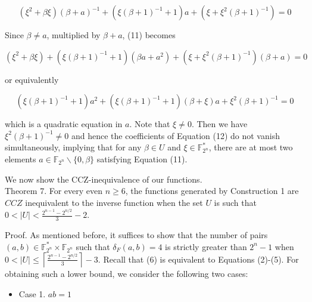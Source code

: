 \documentclass[10pt]{article}
\begin{document}
\begin{equation*}
\left(\xi^{2}+\beta \xi\right)(\beta+a)^{-1}+\left(\xi(\beta+1)^{-1}+1\right) a+\left(\xi+\xi^{2}(\beta+1)^{-1}\right)=0 \tag{11}
\end{equation*}


Since $\beta \neq a$, multiplied by $\beta+a$, (11) becomes

$$
\left(\xi^{2}+\beta \xi\right)+\left(\xi(\beta+1)^{-1}+1\right)\left(\beta a+a^{2}\right)+\left(\xi+\xi^{2}(\beta+1)^{-1}\right)(\beta+a)=0
$$

or equivalently


\begin{equation*}
\left(\xi(\beta+1)^{-1}+1\right) a^{2}+\left(\xi(\beta+1)^{-1}+1\right)(\beta+\xi) a+\xi^{2}(\beta+1)^{-1}=0 \tag{12}
\end{equation*}


which is a quadratic equation in $a$. Note that $\xi \neq 0$. Then we have $\xi^{2}(\beta+1)^{-1} \neq 0$ and hence the coefficients of Equation (12) do not vanish simultaneously, implying that for any $\beta \in U$ and $\xi \in \mathbb{F}_{2^{n}}^{*}$, there are at most two elements $a \in \mathbb{F}_{2^{n}} \backslash\{0, \beta\}$ satisfying Equation (11).

We now show the CCZ-inequivalence of our functions.\\
Theorem 7. For every even $n \geq 6$, the functions generated by Construction 1 are $C C Z$ inequivalent to the inverse function when the set $U$ is such that $0<|U|<\frac{2^{n-1}-2^{n / 2}}{3}-2$.

Proof. As mentioned before, it suffices to show that the number of pairs $(a, b) \in \mathbb{F}_{2^{n}}^{*} \times \mathbb{F}_{2^{n}}$ such that $\delta_{F}(a, b)=4$ is strictly greater than $2^{n}-1$ when $0<|U| \leq\left\lceil\frac{2^{n-1}-2^{n / 2}}{3}\right\rceil-3$. Recall that (6) is equivalent to Equations (2)-(5). For obtaining such a lower bound, we consider the following two cases:

\begin{itemize}
  \item Case 1. $a b=1$
\end{itemize}
\end{document}
